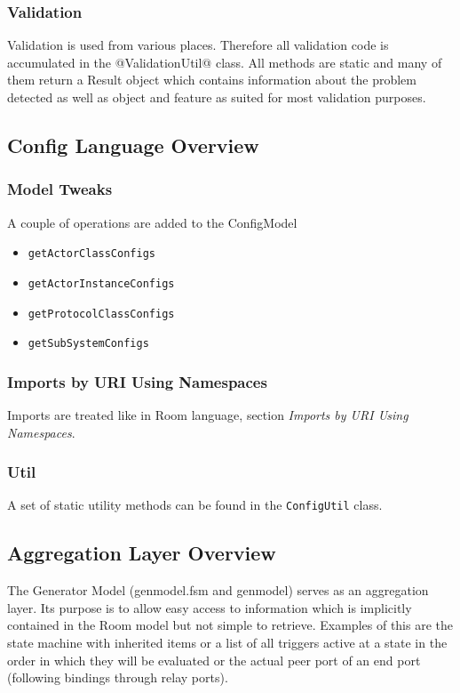 \subsubsection{Validation}

Validation is used from various places. Therefore all validation code is accumulated in the 
@ValidationUtil@ class. All methods are static and many of them return a Result object which contains 
information about the problem detected as well as object and feature as suited for most validation purposes.

\subsection{Config Language Overview}

\subsubsection{Model Tweaks}

A couple of operations are added to the ConfigModel
\begin{itemize}
\item \texttt{getActorClassConfigs}
\item \texttt{getActorInstanceConfigs}
\item \texttt{getProtocolClassConfigs}
\item \texttt{getSubSystemConfigs}
\end{itemize}

\subsubsection{Imports by URI Using Namespaces}

Imports are treated like in Room language, section \textit{Imports by URI Using Namespaces}.

\subsubsection{Util}

A set of static utility methods can be found in the \texttt{ConfigUtil} class.

\subsection{Aggregation Layer Overview}

The \eTrice{} Generator Model (genmodel.fsm and genmodel) serves as an aggregation layer. Its purpose is to allow easy access 
to information which is implicitly contained in the Room model but not simple to retrieve.
Examples of this are the state machine with inherited items or a list of all triggers active at a state in 
the order in which they will be evaluated or the actual peer port of an end port (following bindings 
through relay ports).

